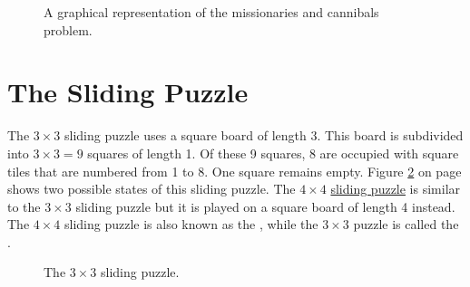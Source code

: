 \begin{figure}[!ht]
  \centering
  \caption{A graphical representation of the missionaries and cannibals problem.}
  \label{fig:missionaries.pdf}
\end{figure}


\section{The Sliding Puzzle} 
The $3 \times 3$ sliding puzzle uses a
square board of length 3.  This board is subdivided into $3 \times 3 = 9$ squares of length 1.  Of
these 9 squares, 8 are occupied with square tiles that are numbered from 1 to 8.  One square remains
empty. Figure \ref{fig:8-puzzle.pdf} on page \pageref{fig:8-puzzle.pdf} shows two possible states of this
sliding puzzle.  The $4 \times 4$ \href{https://en.wikipedia.org/wiki/15_puzzle}{sliding puzzle}
is similar to the $3 \times 3$ sliding puzzle but it is played on a square board of length 4
instead.  The $4 \times 4$ sliding puzzle is also known as the , while the $3 \times 3$ puzzle is
called the .

\begin{figure}[!ht]
\centering
{}  
\caption{The $3 \times 3$ sliding puzzle.}
\label{fig:8-puzzle.pdf}
\end{figure}

